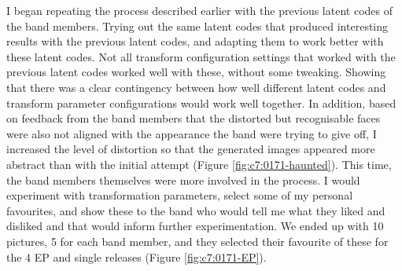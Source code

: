 I began repeating the process described earlier with the previous latent codes of the band members. 
Trying out the same latent codes that produced interesting results with the previous latent codes, and adapting them to work better with these latent codes. 
Not all transform configuration settings that worked with the previous latent codes worked well with these, without some tweaking. 
Showing that there was a clear contingency between how well different latent codes and transform parameter configurations would work well together.
In addition, based on feedback from the band members that the distorted but recognisable faces were also not aligned with the appearance the band were trying to give off, I increased the level of distortion so that the generated images appeared more abstract than with the initial attempt (Figure \ref{fig:c7:0171-haunted}). 
This time, the band members themselves were more involved in the process. I would experiment with transformation parameters, select some of my personal favourites, and show these to the band who would tell me what they liked and disliked and that would inform further experimentation. 
We ended up with 10 pictures, 5 for each band member, and they selected their favourite of these for the 4 EP and single releases (Figure \ref{fig:c7:0171-EP}). 

